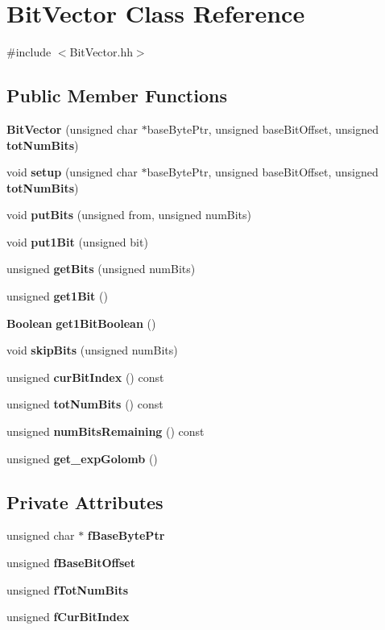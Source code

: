 \section{Bit\+Vector Class Reference}
\label{classBitVector}


{\ttfamily \#include $<$Bit\+Vector.\+hh$>$}

\subsection*{Public Member Functions}
\begin{DoxyCompactItemize}
\item 
{\bf Bit\+Vector} (unsigned char $\ast$base\+Byte\+Ptr, unsigned base\+Bit\+Offset, unsigned {\bf tot\+Num\+Bits})
\item 
void {\bf setup} (unsigned char $\ast$base\+Byte\+Ptr, unsigned base\+Bit\+Offset, unsigned {\bf tot\+Num\+Bits})
\item 
void {\bf put\+Bits} (unsigned from, unsigned num\+Bits)
\item 
void {\bf put1\+Bit} (unsigned bit)
\item 
unsigned {\bf get\+Bits} (unsigned num\+Bits)
\item 
unsigned {\bf get1\+Bit} ()
\item 
{\bf Boolean} {\bf get1\+Bit\+Boolean} ()
\item 
void {\bf skip\+Bits} (unsigned num\+Bits)
\item 
unsigned {\bf cur\+Bit\+Index} () const 
\item 
unsigned {\bf tot\+Num\+Bits} () const 
\item 
unsigned {\bf num\+Bits\+Remaining} () const 
\item 
unsigned {\bf get\+\_\+exp\+Golomb} ()
\end{DoxyCompactItemize}
\subsection*{Private Attributes}
\begin{DoxyCompactItemize}
\item 
unsigned char $\ast$ {\bf f\+Base\+Byte\+Ptr}
\item 
unsigned {\bf f\+Base\+Bit\+Offset}
\item 
unsigned {\bf f\+Tot\+Num\+Bits}
\item 
unsigned {\bf f\+Cur\+Bit\+Index}
\end{DoxyCompactItemize}


